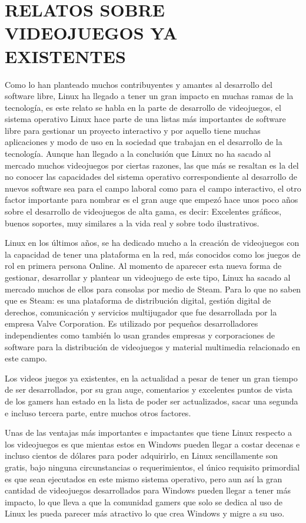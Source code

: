 \section*{RELATOS SOBRE VIDEOJUEGOS YA EXISTENTES}
 
Como lo han planteado muchos contribuyentes y amantes al
desarrollo del software libre, Linux ha llegado a tener un gran
impacto en muchas ramas de la tecnología, es este relato se
habla en la parte de desarrollo de videojuegos, el sistema
operativo Linux hace parte de una listas más importantes de
software libre para gestionar un proyecto interactivo y por
aquello tiene muchas aplicaciones y modo de uso en la sociedad
que trabajan en el desarrollo de la tecnología. Aunque han
llegado a la conclusión que Linux no ha sacado al mercado
muchos videojuegos por ciertas razones, las que más se resaltan
es la del no conocer las capacidades del sistema operativo
correspondiente al desarrollo de nuevos software sea para el
campo laboral como para el campo interactivo, el otro factor
importante para nombrar es el gran auge que empezó hace unos
poco años sobre el desarrollo de videojuegos de alta gama, es
decir: Excelentes gráficos, buenos soportes, muy similares a la vida real y sobre todo ilustrativos.

Linux en los últimos años, se ha dedicado mucho a la creación
de videojuegos con la capacidad de tener una plataforma en la
red, más conocidos como los juegos de rol en primera persona
Online. Al momento de aparecer esta nueva forma de gestionar,
desarrollar y plantear un videojuego de este tipo, Linux ha
sacado al mercado muchos de ellos para consolas por medio de
Steam. Para lo que no saben que es Steam: es una plataforma de
distribución digital, gestión digital de derechos, comunicación y
servicios multijugador que fue desarrollada por la empresa Valve
Corporation. Es utilizado por pequeños desarrolladores
independientes como también lo usan grandes empresas y
corporaciones de software para la distribución de videojuegos y
material multimedia relacionado en este campo.

Los videos juegos ya existentes, en la actualidad a pesar de
tener un gran tiempo de ser desarrollados, por su gran auge,
comentarios y excelentes puntos de vista de los gamers han
estado en la lista de poder ser actualizados, sacar una segunda e
incluso tercera parte, entre muchos otros factores.

Unas de las ventajas más importantes e impactantes que tiene
Linux respecto a los videojuegos es que mientas estos en
Windows pueden llegar a costar decenas e incluso cientos de
dólares para poder adquirirlo, en Linux sencillamente son gratis,
bajo ninguna circunstancias o requerimientos, el único requisito
primordial es que sean ejecutados en este mismo sistema
operativo, pero aun así la gran cantidad de videojuegos
desarrollados para Windows pueden llegar a tener más impacto,
lo que lleva a que la comunidad gamers que solo se dedica al uso
de Linux les pueda parecer más atractivo lo que crea Windows y
migre a su uso.


